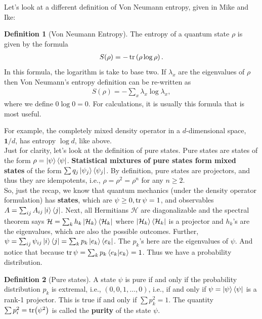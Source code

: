 \documentclass{book}
\theoremstyle{definition}
\newtheorem{defn}{Definition}[section]
\newcommand{\had}{\mathcal{H}}
\newcommand{\lp}{\left(}
\newcommand{\rp}{\right)}
\begin{document}
Let's look at a different definition of Von Neumann entropy, given in Mike and Ike:
\begin{defn}[Von Neumann Entropy]
	The entropy of a quantum state $\rho$ is given by the formula
	\begin{align}
	S(\rho) = -\tr\lp \rho \log \rho \rp.
	\end{align}
	In this formula, the logarithm is take to base two. If $\lambda_x$ are the eigenvalues of $\rho$ then Von Neumann's entropy definition can be re-written as
	\begin{align}
	S(\rho) = -\sum_x \lambda_x \log \lambda_x,
	\end{align}
	where we define $0 \log 0 = 0$. For calculations, it is usually this formula that is most useful. 
\end{defn}


For example, the completely mixed density operator in a $d$-dimensional space, $\bm{1}/d$, has entropy $\log d$, like above. \\


Just for clarity, let's look at the definition of pure states. Pure states are states of the form $\rho = \ket{\psi}\bra{\psi}$. \textbf{Statistical mixtures of pure states form mixed states} of the form $\sum q_j \ket{\psi_j}\bra{\psi_j}$. By definition, pure states are projectors, and thus they are idempotents, i.e., $\rho = \rho^2 = \rho^n$ for any $n\geq 2$. \\


So, just the recap, we know that quantum mechanics  (under the density operator formulation) has \textbf{states}, which are $\psi \geq 0, \tr\psi = 1$, and observables $A = \sum_{ij}A_{ij}\ket{i}\bra{j}$. Next, all Hermitians $\had$ are diagonalizable and the spectral theorem says $\had = \sum_k h_k \ket{\had_k}\bra{\had_k}$ where $\ket{\had_k}\bra{\had_k}$ is a projector and $h_k$'s are the eigenvalues, which are also the possible outcomes. Further, $\psi = \sum_{ij}\psi_{ij}\ket{i}\bra{j} = \sum_k p_k \ket{e_k}\bra{e_k}$. The $p_k$'s here are the eigenvalues of $\psi$. And notice that because $\tr\psi = \sum_k p_k\braket{e_k} = 1$. Thus we have a probability distribution. \\

\begin{defn}[Pure states]
	A state $\psi$ is pure if and only if the probability distribution $p_k$ is extremal, i.e., $(0,0,1,\dots,0)$, i.e., if and only if $\psi = \ket{\psi}\bra{\psi}$ is a rank-1 projector. This is true if and only if $\sum p_k^2 = 1$. The quantity $\sum p_i^2 = \tr(\psi^2)$ is called the \textbf{purity} of the state $\psi$. 
\end{defn}  
\end{document}
